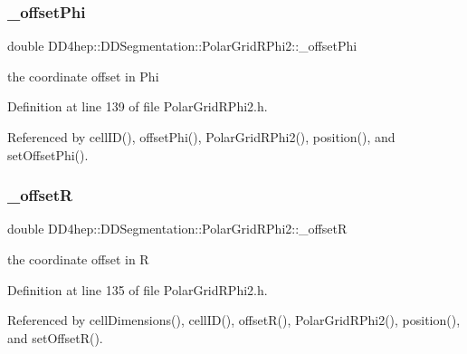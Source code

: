 \subsubsection{\texorpdfstring{\+\_\+offset\+Phi}{\_offsetPhi}}
{\footnotesize\ttfamily double D\+D4hep\+::\+D\+D\+Segmentation\+::\+Polar\+Grid\+R\+Phi2\+::\+\_\+offset\+Phi\hspace{0.3cm}{\ttfamily [protected]}}



the coordinate offset in Phi 



Definition at line 139 of file Polar\+Grid\+R\+Phi2.\+h.



Referenced by cell\+I\+D(), offset\+Phi(), Polar\+Grid\+R\+Phi2(), position(), and set\+Offset\+Phi().

\hypertarget{class_d_d4hep_1_1_d_d_segmentation_1_1_polar_grid_r_phi2_a775bd660c36c5310b65195f3080e92fe}{}\label{class_d_d4hep_1_1_d_d_segmentation_1_1_polar_grid_r_phi2_a775bd660c36c5310b65195f3080e92fe} 
\subsubsection{\texorpdfstring{\+\_\+offsetR}{\_offsetR}}
{\footnotesize\ttfamily double D\+D4hep\+::\+D\+D\+Segmentation\+::\+Polar\+Grid\+R\+Phi2\+::\+\_\+offsetR\hspace{0.3cm}{\ttfamily [protected]}}



the coordinate offset in R 



Definition at line 135 of file Polar\+Grid\+R\+Phi2.\+h.



Referenced by cell\+Dimensions(), cell\+I\+D(), offset\+R(), Polar\+Grid\+R\+Phi2(), position(), and set\+Offset\+R().

\hypertarget{class_d_d4hep_1_1_d_d_segmentation_1_1_polar_grid_r_phi2_a95332f186af59bd325277868ffeb3ea6}{}\label{class_d_d4hep_1_1_d_d_segmentation_1_1_polar_grid_r_phi2_a95332f186af59bd325277868ffeb3ea6} 
